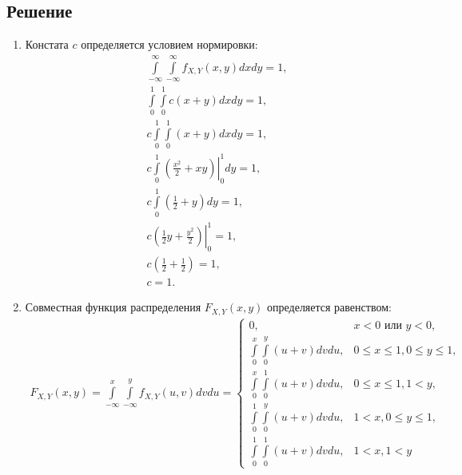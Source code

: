 \subsection*{Решение}
\begin{enumerate}
    \item Констата $c$ определяется условием нормировки:
    \begin{gather}
        \int \limits_{-\infty}^{\infty} \int \limits_{-\infty}^{\infty} f_{X,Y}(x,y) dx dy = 1 , \\
        \int \limits_{0}^{1} \int \limits_{0}^{1} c ( x + y ) dx dy = 1 , \\
        c \int \limits_{0}^{1} \int \limits_{0}^{1} ( x + y ) dx dy = 1 , \\
        c \int \limits_{0}^{1} \left . \left ( \frac{x^2}{2} + x y \right ) \right |_0^1 dy = 1 , \\
        c \int \limits_{0}^{1} \left ( \frac{1}{2} + y \right ) dy = 1 , \\
        c \left . \left ( \frac{1}{2} y + \frac{y^2}{2} \right ) \right |_0^1 = 1 , \\
        c \left ( \frac{1}{2} + \frac{1}{2} \right ) = 1 , \\
        c = 1 .
    \end{gather}

    \item Совместная функция распределения $F_{X,Y}(x,y)$ определяется равенством:
    \begin{multline}
        F_{X,Y}(x,y)
        = \int \limits_{-\infty}^x \int \limits_{-\infty}^y f_{X,Y}(u,v) dv du
        = \left \{
        \begin{array}{ll}
            0 ,                                                 & x < 0 \text{ или } y < 0 ,     \\
            \int \limits_0^x \int \limits_0^y ( u + v ) dv du , & 0 \le x \le 1, 0 \le y \le 1 , \\
            \int \limits_0^x \int \limits_0^1 ( u + v ) dv du , & 0 \le x \le 1, 1 < y ,         \\
            \int \limits_0^1 \int \limits_0^y ( u + v ) dv du , & 1 < x, 0 \le y \le 1 ,         \\
            \int \limits_0^1 \int \limits_0^1 ( u + v ) dv du , & 1 < x, 1 < y
        \end{array}
        \right .
    \end{multline}

    \begin{figure}[h]
        \centering
        \begin{subfigure}{0.3\textwidth}
\end{subfigure}
\end{figure}
\end{enumerate}
